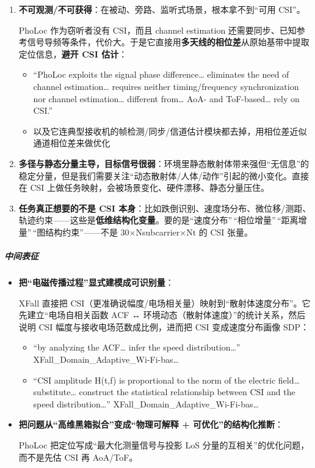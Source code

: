 \documentclass[
]{article}
\begin{document}
\begin{enumerate}
\def\labelenumi{\arabic{enumi}.}
\item
  \textbf{不可观测/不可获得}：在被动、旁路、监听式场景，根本拿不到``可用
  CSI''。

  PhoLoc 作为窃听者没有 CSI，而且 channel estimation
  还需要同步、已知参考信号导频等条件，代价大。于是它直接用\textbf{多天线的相位差}从原始基带中提取定位信息，\textbf{避开
  CSI 估计}：

  \begin{itemize}
  \item
    ``PhoLoc exploits the signal phase difference\ldots{} eliminates the
    need of channel estimation\ldots{} requires neither timing/frequency
    synchronization nor channel estimation\ldots{} different
    from\ldots{} AoA- and ToF-based\ldots{} rely on CSI.''
  \item
    以及它连典型接收机的帧检测/同步/信道估计模块都去掉，用相位差近似通道相位差来做优化
  \end{itemize}
\item
  \textbf{多径与静态分量主导，目标信号很弱}：环境里静态散射体带来强但``无信息''的稳定分量，但是我们需要关注``动态散射体/人体/动作''引起的微小变化。直接在
  CSI 上做任务映射，会被场景变化、硬件漂移、静态分量压住。
\item
  \textbf{任务真正想要的不是 CSI
  本身}：比如跌倒识别、速度场分布、微位移/测距、轨迹约束------这些是\textbf{低维结构化变量}。要的是``速度分布''\,``相位增量''\,``距离增量''\,``图结构约束''------不是
  30×Nsubcarrier×Nt 的 CSI 张量。
\end{enumerate}

\subparagraph{中间表征}\label{ux4e2dux95f4ux8868ux5f81}

\begin{itemize}
\item
  \textbf{把``电磁传播过程''显式建模成可识别量}：

  XFall 直接把
  CSI（更准确说幅度/电场相关量）映射到``散射体速度分布''。它先建立``电场自相关函数
  ACF ↔ 环境动态（散射体速度）''的统计关系，然后说明 CSI
  幅度与接收电场范数成比例，进而把 CSI 变成速度分布画像 SDP：

  \begin{itemize}
  \item
    ``by analyzing the ACF\ldots{} infer the speed distribution\ldots''
    XFall\_Domain\_Adaptive\_Wi-Fi-bas\ldots{}
  \item
    ``CSI amplitude \textbar H(t,f)\textbar{} is proportional to the
    norm of the electric field\ldots{} substitute\ldots{} construct the
    statistical relationship between CSI and the speed
    distribution\ldots'' XFall\_Domain\_Adaptive\_Wi-Fi-bas\ldots{}
  \end{itemize}
\item
  \textbf{把问题从``高维黑箱拟合''变成``物理可解释 +
  可优化''的结构化推断}：

  PhoLoc 把定位写成``最大化测量信号与投影 LoS
  分量的互相关''的优化问题，而不是先估 CSI 再 AoA/ToF。
\end{itemize}
\end{document}
